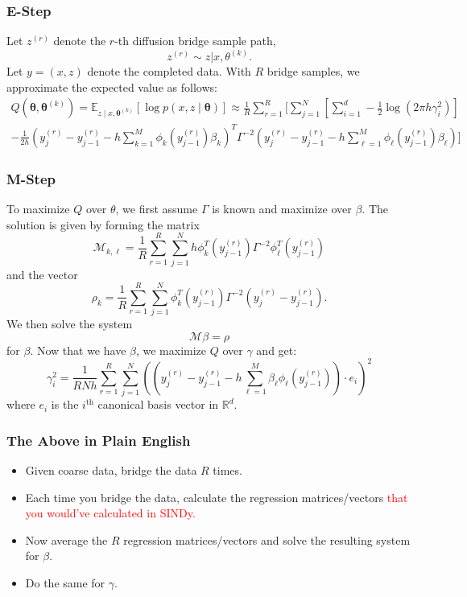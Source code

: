 \documentclass{beamer}
\newcommand{\btheta}{\ensuremath{\boldsymbol{\theta}}}
\begin{document}
\begin{frame}
\frametitle{E-Step}
Let $z^{(r)}$ denote the $r$-th diffusion bridge sample path,
$$
z^{(r)} \sim z | x, \theta^(k).
$$
Let $y = (x,z)$ denote the completed data.  With $R$ bridge samples, we approximate the expected value as follows:
\begin{multline*}
Q(\btheta, \btheta^{(k)}) = \mathbb{E}_{z \mid x, \btheta^{(k)}} [\log p(x, z \mid \btheta)] \approx \frac{1}{R} \sum_{r=1}^R \biggl[ \sum_{j=1}^N \left[ \sum_{i=1}^d -\frac{1}{2} \log (2 \pi h \gamma_i^2) \right] \\
 -\frac{1}{2h} (y_j^{(r)} - y_{j-1}^{(r)} - h \sum_{k=1}^M \phi_k(y_{j-1}^{(r)}) \beta_k )^T \Gamma^{-2} (y_j^{(r)} - y_{j-1}^{(r)} - h \sum_{\ell=1}^M \phi_\ell(y_{j-1}^{(r)}) \beta_\ell ) \biggr]
\end{multline*}
\end{frame}

\begin{frame}
\frametitle{M-Step}
To maximize $Q$ over $\theta$, we first assume $\Gamma$ is known and maximize over $\beta$.  The solution is given by forming the matrix
$$
\mathcal{M}_{k,\ell} = \frac{1}{R} \sum_{r=1}^{R} \sum_{j=1}^N h \phi_k^T (y_{j-1}^{(r)}) \Gamma^{-2} \phi_\ell^T (y_{j-1}^{(r)})
$$
and the vector
$$
\rho_k = \frac{1}{R} \sum_{r=1}^{R} \sum_{j=1}^N \phi_k^T (y_{j-1}^{(r)}) \Gamma^{-2} (y_j^{(r)} - y_{j-1}^{(r)}).
$$
We then solve the system
$$
\mathcal{M} \beta = \rho
$$
for $\beta$.  Now that we have $\beta$, we maximize $Q$ over $\gamma$ and get:
$$
\gamma_i^2 = \frac{1}{R N h} \sum_{r=1}^{R} \sum_{j=1}^N (( y_j^{(r)} - y_{j-1}^{(r)} - h \sum_{\ell=1}^M \beta_\ell \phi_\ell (y_{j-1}^{(r)}) ) \cdot e_i )^2
$$
where $e_i$ is the $i^\text{th}$ canonical basis vector in $\mathbb{R}^d$.
\end{frame}

\begin{frame}
\frametitle{The Above in Plain English}
\begin{itemize}
\item Given coarse data, bridge the data $R$ times.
\item Each time you bridge the data, calculate the regression matrices/vectors \textcolor{red}{that you would've calculated in SINDy.}
\item Now average the $R$ regression matrices/vectors and solve the resulting system for $\beta$.
\item Do the same for $\gamma$.
\end{itemize}
\end{frame}
\end{document}
